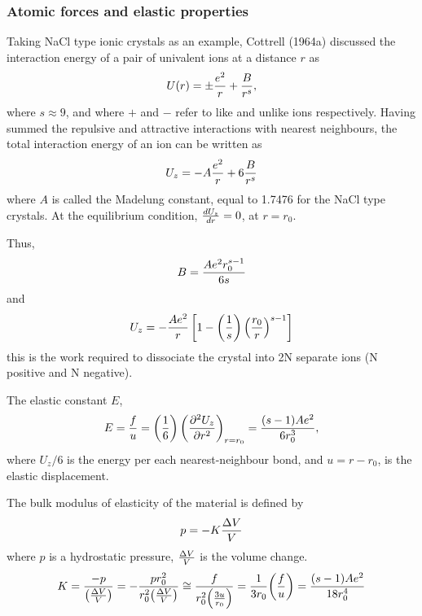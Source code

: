 \subsubsection{Atomic forces and elastic properties} %
Taking NaCl type ionic crystals as an example, Cottrell (1964a) 
discussed the interaction energy of a pair of univalent ions at a 
distance $r$ as
\begin{equation} %
U(r) = \pm {e^2 \over r} + {B \over r^s},
\end{equation}
where $s \approx 9$, and where $+$ and $-$ refer to like and 
unlike ions respectively. Having summed the repulsive and 
attractive interactions with nearest neighbours, the total 
interaction energy of an ion can be written as
\begin{equation}
U_z = - A {e^2 \over r} + 6 {B \over r^s}
\end{equation}
where $A$ is called the Madelung constant, equal to 1.7476 for the 
NaCl type crystals. At the equilibrium condition, ${{dU_z} \over 
{dr}} = 0 $, at $r = r_0$. 

\noindent 
Thus,
\begin{equation}
 B = {{{Ae^2} r_{0}^{s-1}} \over {6s}}
\end{equation}
and  
\begin{equation} 
U_z =-{Ae^2\over r}\left[{1-\left({1\over s}\right)
\left({r_0\over r}\right)^{s-1}}\right]
\end{equation}
this is the work required to dissociate the crystal into 2N separate 
ions (N positive and N negative).

The elastic constant $E$,
\begin{equation} 
E = {f\over u} = {\left({1\over6}\right) \left({{\partial^2 U_z} 
\over {\partial r^2}}\right)_{r=r_0}} = {{(s-1) Ae^2} \over {6r_0^3}},
\end{equation}
where $U_z/6$ is the energy per each nearest-neighbour bond, 
and $u = r - r_0$, is the elastic displacement.

The bulk modulus of elasticity of the material is defined by
\begin{equation}
p = - K {{\Delta V} \over V }
\end{equation}
where $p$ is a hydrostatic pressure, ${{\Delta V} \over V}$ is the 
volume change.
\begin{equation}
K = {{-p} \over {\left({{\Delta V} \over V}\right)}} = -{{pr_0^2} \over 
{{r_0^2} {\left({{\Delta V}\over V}\right)}}} \cong 
{ f \over {{r_0^2} {\left({{3u} 
\over {r_0}}\right)}}} = { 1 \over {3r_0}} {\left({f \over u}\right)} 
= {{(s-1) Ae^2} \over {18r_0^4}}
\end{equation}

